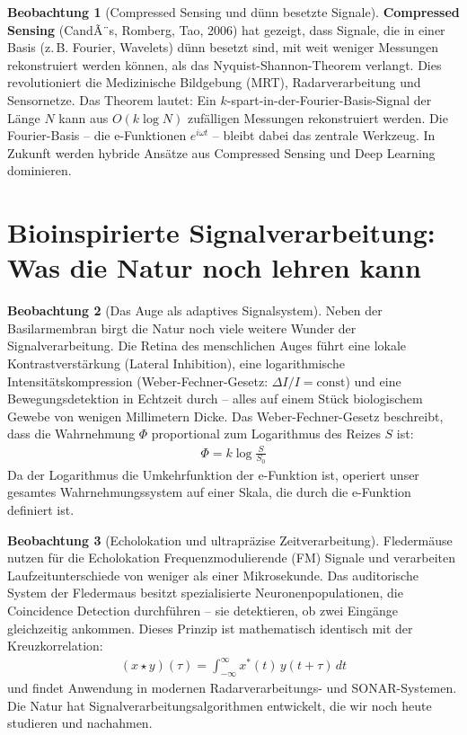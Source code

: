 ﻿\documentclass[a4paper,12pt]{report}
\theoremstyle{definition}
\newtheorem{beobachtung}{Beobachtung}
\begin{document}
	\begin{beobachtung}[Compressed Sensing und dünn besetzte Signale]
		\textbf{Compressed Sensing} (CandÃ¨s, Romberg, Tao, 2006) hat gezeigt, dass Signale, die in einer Basis (z.\,B. Fourier, Wavelets) dünn besetzt sind, mit weit weniger Messungen rekonstruiert werden können, als das Nyquist-Shannon-Theorem verlangt. Dies revolutioniert die Medizinische Bildgebung (MRT), Radarverarbeitung und Sensornetze. Das Theorem lautet: Ein $k$-spart-in-der-Fourier-Basis-Signal der Länge $N$ kann aus $O(k \log N)$ zufälligen Messungen rekonstruiert werden. Die Fourier-Basis -- die e-Funktionen $e^{i\omega t}$ -- bleibt dabei das zentrale Werkzeug. In Zukunft werden hybride Ansätze aus Compressed Sensing und Deep Learning dominieren.
	\end{beobachtung}
	
	\section{Bioinspirierte Signalverarbeitung: Was die Natur noch lehren kann}
	
	\begin{beobachtung}[Das Auge als adaptives Signalsystem]
		Neben der Basilarmembran birgt die Natur noch viele weitere Wunder der Signalverarbeitung. Die Retina des menschlichen Auges führt eine lokale Kontrastverstärkung (Lateral Inhibition), eine logarithmische Intensitätskompression (Weber-Fechner-Gesetz: $\Delta I / I = \text{const}$) und eine Bewegungsdetektion in Echtzeit durch -- alles auf einem Stück biologischem Gewebe von wenigen Millimetern Dicke. Das Weber-Fechner-Gesetz beschreibt, dass die Wahrnehmung $\Phi$ proportional zum Logarithmus des Reizes $S$ ist:
		\begin{align}
			\Phi = k \log\frac{S}{S_0}
		\end{align}
		Da der Logarithmus die Umkehrfunktion der e-Funktion ist, operiert unser gesamtes Wahrnehmungssystem auf einer Skala, die durch die e-Funktion definiert ist.
	\end{beobachtung}
	
	\begin{beobachtung}[Echolokation und ultrapräzise Zeitverarbeitung]
		Fledermäuse nutzen für die Echolokation Frequenzmodulierende (FM) Signale und verarbeiten Laufzeitunterschiede von weniger als einer Mikrosekunde. Das auditorische System der Fledermaus besitzt spezialisierte Neuronenpopulationen, die Coincidence Detection durchführen -- sie detektieren, ob zwei Eingänge gleichzeitig ankommen. Dieses Prinzip ist mathematisch identisch mit der Kreuzkorrelation:
		\begin{align}
			(x \star y)(\tau) = \int_{-\infty}^{\infty} x^*(t)\, y(t + \tau)\, dt
		\end{align}
		und findet Anwendung in modernen Radarverarbeitungs- und SONAR-Systemen. Die Natur hat Signalverarbeitungsalgorithmen entwickelt, die wir noch heute studieren und nachahmen.
	\end{beobachtung}
	
\end{document}
